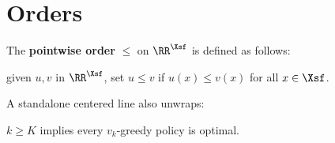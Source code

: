 \section{Orders}

\begin{example}\label{eg:ppor}
    The \textbf{pointwise order} $\leq$ on $\RR^\Xsf$ is defined as follows:
    \begin{center}
        given $u, v$ in $\RR^\Xsf$, set
        $u \leq v$ if $u(x) \leq v(x)$  for all $x \in \Xsf$.
    \end{center}
\end{example}

A standalone centered line also unwraps:

\begin{center}
    $k \geq K$ implies every $v_k$-greedy policy is optimal.
\end{center}
